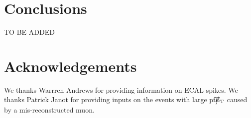 \section{Conclusions}
TO BE ADDED

\section{Acknowledgements}
We thanks Warrren Andrews for providing information on ECAL spikes.
We thanks Patrick Janot for providing inputs on the events with large pf$\big\slash\hspace{-1.6ex}{E_\text{T}}$ 
caused by a mis-reconstructed muon.

